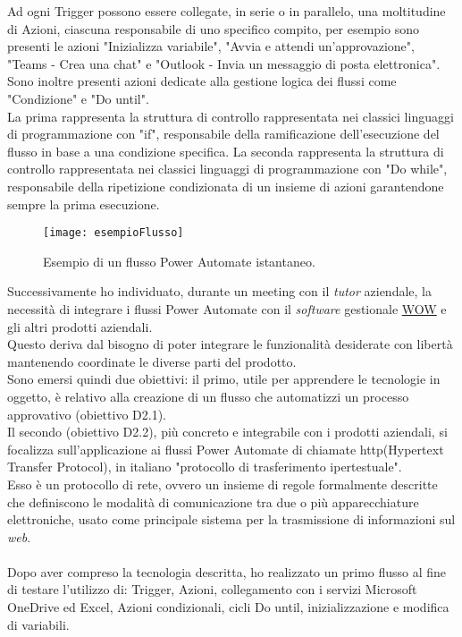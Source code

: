 \noindent Ad ogni Trigger possono essere collegate, in serie o in parallelo, una moltitudine di Azioni, ciascuna responsabile di uno specifico compito, per esempio sono presenti le azioni "Inizializza variabile", "Avvia e attendi un'approvazione", "Teams - Crea una chat" e "Outlook - Invia un messaggio di posta elettronica".\\
Sono inoltre presenti azioni dedicate alla gestione logica dei flussi come "Condizione" e "Do until".\\
La prima rappresenta la struttura di controllo rappresentata nei classici linguaggi di programmazione con "if", responsabile della ramificazione dell'esecuzione del flusso in base a una condizione specifica.
La seconda rappresenta la struttura di controllo rappresentata nei classici linguaggi di programmazione con "Do while", responsabile della ripetizione condizionata di un insieme di azioni garantendone sempre la prima esecuzione.
\begin{figure}[htbp] 
    \centering 
    \texttt{[image: esempioFlusso]} 
    \caption{Esempio di un flusso Power Automate istantaneo.}
    \label{fig:esempioFlusso}
\end{figure}
\newline \noindent Successivamente ho individuato, durante un meeting con il \emph{tutor} aziendale, la necessità di integrare i flussi Power Automate con il \emph{software} gestionale \hyperref[WOW]{WOW} e gli altri prodotti aziendali.\\
Questo deriva dal bisogno di poter integrare le funzionalità desiderate con libertà mantenendo coordinate le diverse parti del prodotto.\\
Sono emersi quindi due obiettivi: il primo, utile per apprendere le tecnologie in oggetto, è relativo alla creazione di un flusso che automatizzi un processo approvativo (obiettivo D2.1).\\
Il secondo (obiettivo D2.2), più concreto e integrabile con i prodotti aziendali, si focalizza sull'applicazione ai flussi Power Automate di chiamate \gls{http}(Hypertext Transfer Protocol), in italiano "protocollo di trasferimento ipertestuale".\\
Esso è un protocollo di rete, ovvero un insieme di regole formalmente descritte che definiscono le modalità di comunicazione tra due o più apparecchiature elettroniche, usato come principale sistema per la trasmissione di informazioni sul \emph{web}.\\\\
Dopo aver compreso la tecnologia descritta, ho realizzato un primo flusso al fine di testare l'utilizzo di: Trigger, Azioni, collegamento con i servizi Microsoft OneDrive ed Excel, Azioni condizionali, cicli Do until, inizializzazione e modifica di variabili.\\
